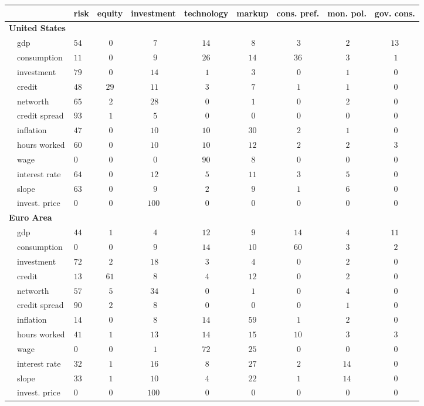 \begin{center}
\begin{tabular}{llccccccc}
\hline
\multicolumn{1}{l}{}&\multicolumn{1}{c}{risk}&\multicolumn{1}{c}{equity}&\multicolumn{1}{c}{investment}&\multicolumn{1}{c}{technology}&\multicolumn{1}{c}{markup}&\multicolumn{1}{c}{cons. pref.}&\multicolumn{1}{c}{mon. pol.}&\multicolumn{1}{c}{gov. cons.}\tabularnewline
\hline
{\bfseries United States}&&&&&&&&\tabularnewline
~~gdp&$54$&$~0$&$~~7$&$14$&$~8$&$~3$&$~2$&$13$\tabularnewline
~~consumption&$11$&$~0$&$~~9$&$26$&$14$&$36$&$~3$&$~1$\tabularnewline
~~investment&$79$&$~0$&$~14$&$~1$&$~3$&$~0$&$~1$&$~0$\tabularnewline
~~credit&$48$&$29$&$~11$&$~3$&$~7$&$~1$&$~1$&$~0$\tabularnewline
~~networth&$65$&$~2$&$~28$&$~0$&$~1$&$~0$&$~2$&$~0$\tabularnewline
~~credit spread&$93$&$~1$&$~~5$&$~0$&$~0$&$~0$&$~0$&$~0$\tabularnewline
~~inflation&$47$&$~0$&$~10$&$10$&$30$&$~2$&$~1$&$~0$\tabularnewline
~~hours worked&$60$&$~0$&$~10$&$10$&$12$&$~2$&$~2$&$~3$\tabularnewline
~~wage&$ 0$&$~0$&$~~0$&$90$&$~8$&$~0$&$~0$&$~0$\tabularnewline
~~interest rate&$64$&$~0$&$~12$&$~5$&$11$&$~3$&$~5$&$~0$\tabularnewline
~~slope&$63$&$~0$&$~~9$&$~2$&$~9$&$~1$&$~6$&$~0$\tabularnewline
~~invest. price&$ 0$&$~0$&$100$&$~0$&$~0$&$~0$&$~0$&$~0$\tabularnewline
\hline
{\bfseries Euro Area}&&&&&&&&\tabularnewline
~~gdp&$44$&$~1$&$~~4$&$12$&$~9$&$14$&$~4$&$11$\tabularnewline
~~consumption&$ 0$&$~0$&$~~9$&$14$&$10$&$60$&$~3$&$~2$\tabularnewline
~~investment&$72$&$~2$&$~18$&$~3$&$~4$&$~0$&$~2$&$~0$\tabularnewline
~~credit&$13$&$61$&$~~8$&$~4$&$12$&$~0$&$~2$&$~0$\tabularnewline
~~networth&$57$&$~5$&$~34$&$~0$&$~1$&$~0$&$~4$&$~0$\tabularnewline
~~credit spread&$90$&$~2$&$~~8$&$~0$&$~0$&$~0$&$~1$&$~0$\tabularnewline
~~inflation&$14$&$~0$&$~~8$&$14$&$59$&$~1$&$~2$&$~0$\tabularnewline
~~hours worked&$41$&$~1$&$~13$&$14$&$15$&$10$&$~3$&$~3$\tabularnewline
~~wage&$ 0$&$~0$&$~~1$&$72$&$25$&$~0$&$~0$&$~0$\tabularnewline
~~interest rate&$32$&$~1$&$~16$&$~8$&$27$&$~2$&$14$&$~0$\tabularnewline
~~slope&$33$&$~1$&$~10$&$~4$&$22$&$~1$&$14$&$~0$\tabularnewline
~~invest. price&$ 0$&$~0$&$100$&$~0$&$~0$&$~0$&$~0$&$~0$\tabularnewline
\hline
\end{tabular}\end{center}

